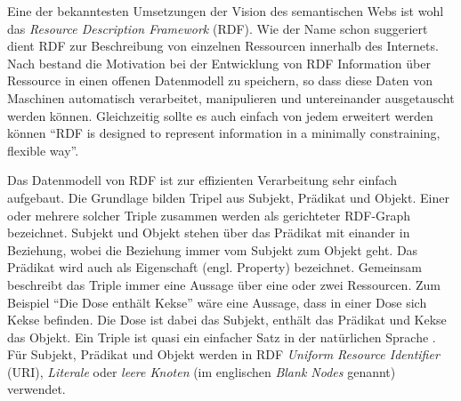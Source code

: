 Eine der bekanntesten Umsetzungen der Vision des semantischen Webs ist wohl das \emph{Resource Description Framework} (RDF). Wie der Name schon suggeriert dient RDF zur Beschreibung von einzelnen Ressourcen innerhalb des Internets. Nach \cite{Klyne2004,Manola2004} bestand die Motivation bei der Entwicklung von RDF Information über Ressource in einen offenen Datenmodell zu speichern, so dass diese Daten von Maschinen automatisch verarbeitet, manipulieren und untereinander ausgetauscht werden können. Gleichzeitig sollte es auch einfach von jedem erweitert werden können \enquote{RDF is designed to represent information in a minimally constraining, flexible way}\cite{Klyne2004}.

\medskip

Das Datenmodell von RDF ist zur effizienten Verarbeitung sehr einfach aufgebaut. Die Grundlage bilden Tripel aus Subjekt, Prädikat und Objekt. Einer oder mehrere solcher Triple zusammen werden als gerichteter RDF-Graph bezeichnet. Subjekt und Objekt stehen über das Prädikat mit einander in Beziehung, wobei die Beziehung immer vom Subjekt zum Objekt geht. Das Prädikat wird auch als Eigenschaft (engl. Property) bezeichnet. Gemeinsam beschreibt das Triple immer eine Aussage über eine oder zwei Ressourcen. Zum Beispiel \enquote{Die Dose enthält Kekse} wäre eine Aussage, dass in einer Dose sich Kekse befinden. Die Dose ist dabei das Subjekt, enthält das Prädikat und Kekse das Objekt. Ein Triple ist quasi ein einfacher Satz in der natürlichen Sprache \cite{Heinzen}. Für Subjekt, Prädikat und Objekt werden in RDF \emph{Uniform Resource Identifier} (URI), \emph{Literale} oder \emph{leere Knoten} (im englischen \emph{Blank Nodes} genannt) verwendet. 

